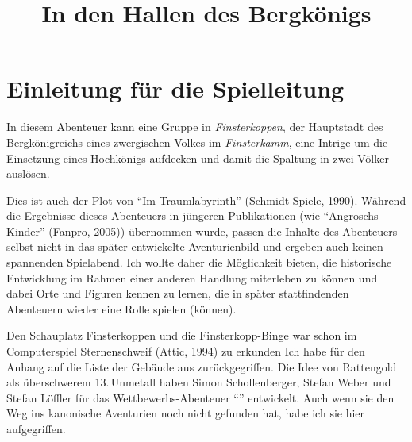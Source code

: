 \documentclass[openright]{Ilaris}
\title{In den Hallen des Bergkönigs}
\begin{document}
	
	\vfill
	
	
	\smallskip
	
	
	\vfill
	\pagestyle{empty}
\inhaltsverzeichnis


\platz
{}


\lizenz

\hauptteil
\spaltenanfang


\section*{Einleitung für die Spielleitung}
In diesem Abenteuer kann eine Gruppe in \emph{Finsterkoppen},
der Hauptstadt des Bergkönigreichs eines zwergischen Volkes im \emph{Finsterkamm},
eine Intrige um die Einsetzung eines Hochkönigs aufdecken und damit die Spaltung in zwei Völker auslösen.

Dies ist auch der Plot von \enquote{Im Traumlabyrinth} (Schmidt Spiele, 1990).
Während die Ergebnisse dieses Abenteuers in jüngeren Publikationen (wie \enquote{Angroschs Kinder} (Fanpro, 2005))
übernommen wurde, passen die Inhalte des Abenteuers selbst nicht in das später entwickelte Aventurienbild und ergeben auch keinen spannenden Spielabend.
Ich wollte daher die Möglichkeit bieten, die historische Entwicklung im Rahmen einer anderen Handlung miterleben zu können
und dabei Orte und Figuren kennen zu lernen, die in später stattfindenden Abenteuern wieder eine Rolle spielen (können).

Den Schauplatz Finsterkoppen und die Finsterkopp-Binge war schon im Computerspiel Sternenschweif (Attic, 1994) zu erkunden%
Ich habe für den Anhang auf die Liste der Gebäude aus  zurückgegriffen. Die Idee von Rattengold als überschwerem 13.\,Unmetall haben Simon Schollenberger, Stefan Weber und Stefan Löffler für das Wettbewerbs-Abenteuer \enquote{} entwickelt. Auch wenn sie den Weg ins kanonische Aventurien noch nicht gefunden hat, habe ich sie hier aufgegriffen.
\end{document}
